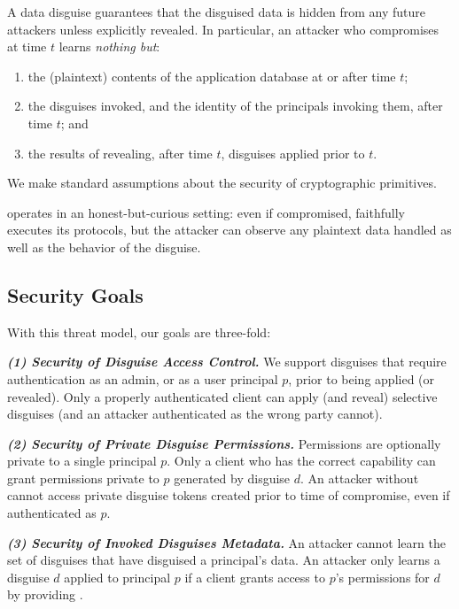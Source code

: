 %
A data disguise guarantees that the disguised data is hidden from any future attackers unless
explicitly revealed.
%
In particular, an attacker who compromises \sys at time $t$ learns \emph{nothing but}:
\begin{enumerate}[nosep]
  \item the (plaintext) contents of the application database at or after time $t$;
  \item the disguises invoked, and the identity of the principals invoking them, after time $t$; and
  \item the results of revealing, after time $t$, disguises applied prior to $t$.
\end{enumerate}
%
We make standard assumptions about the security of cryptographic primitives.
%

%
\sys operates in an honest-but-curious setting: even if compromised, \sys faithfully executes
its protocols, but the attacker can observe any plaintext data handled as well as the behavior
of the disguise.
%

\subsection{Security Goals}

With this threat model, our goals are three-fold: 

\vspace{6pt}\noindent\textbf{\emph{(1) Security of Disguise Access Control.}}
We support disguises that require authentication as an admin, or as a user principal $p$, prior to being applied (or
revealed). Only a properly authenticated client can apply (and reveal) selective disguises
(and an attacker authenticated as the wrong party cannot).

\vspace{6pt}\noindent\textbf{\emph{(2) Security of Private Disguise Permissions.}}
Permissions are optionally private to a single principal $p$. 
Only a client who has the correct capability  can grant \sys permissions private to $p$ generated
by disguise $d$.
%
An attacker without  cannot access private disguise tokens created prior to time of compromise, even if authenticated as $p$.

\vspace{6pt}\noindent\textbf{\emph{(3) Security of Invoked Disguises Metadata.}}
An attacker cannot learn the set of disguises that have disguised a principal's data. An attacker only learns a
disguise $d$ applied to principal $p$ if a client grants \sys access to $p$'s permissions for $d$ by
providing .

